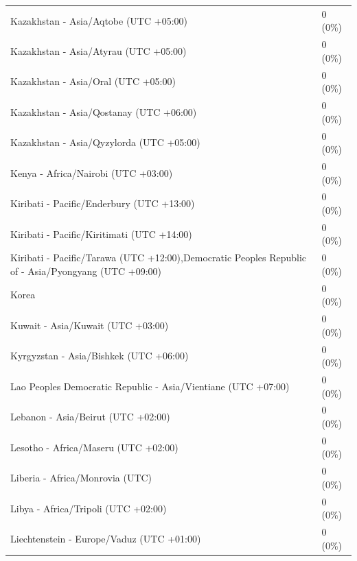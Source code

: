 \documentclass[
  english,
  man]{apa6}
\begin{document}
\begin{appendix}
\begin{table}
{\begin{tabular}[t]{ll}
\hspace{1em}Kazakhstan - Asia/Aqtobe (UTC +05:00) & 0 (0\%)\\
\hspace{1em}Kazakhstan - Asia/Atyrau (UTC +05:00) & 0 (0\%)\\
\hspace{1em}Kazakhstan - Asia/Oral (UTC +05:00) & 0 (0\%)\\
\hspace{1em}Kazakhstan - Asia/Qostanay (UTC +06:00) & 0 (0\%)\\
\addlinespace
\hspace{1em}Kazakhstan - Asia/Qyzylorda (UTC +05:00) & 0 (0\%)\\
\hspace{1em}Kenya - Africa/Nairobi (UTC +03:00) & 0 (0\%)\\
\hspace{1em}Kiribati - Pacific/Enderbury (UTC +13:00) & 0 (0\%)\\
\hspace{1em}Kiribati - Pacific/Kiritimati (UTC +14:00) & 0 (0\%)\\
\hspace{1em}Kiribati - Pacific/Tarawa (UTC +12:00),Democratic Peoples Republic of - Asia/Pyongyang (UTC +09:00) & 0 (0\%)\\
\addlinespace
\hspace{1em}Korea & 0 (0\%)\\
\hspace{1em}Kuwait - Asia/Kuwait (UTC +03:00) & 0 (0\%)\\
\hspace{1em}Kyrgyzstan - Asia/Bishkek (UTC +06:00) & 0 (0\%)\\
\hspace{1em}Lao Peoples Democratic Republic - Asia/Vientiane (UTC +07:00) & 0 (0\%)\\
\hspace{1em}Lebanon - Asia/Beirut (UTC +02:00) & 0 (0\%)\\
\addlinespace
\hspace{1em}Lesotho - Africa/Maseru (UTC +02:00) & 0 (0\%)\\
\hspace{1em}Liberia - Africa/Monrovia (UTC) & 0 (0\%)\\
\hspace{1em}Libya - Africa/Tripoli (UTC +02:00) & 0 (0\%)\\
\hspace{1em}Liechtenstein - Europe/Vaduz (UTC +01:00) & 0 (0\%)\\

\end{tabular}}
\end{table}
\end{appendix}
\end{document}
